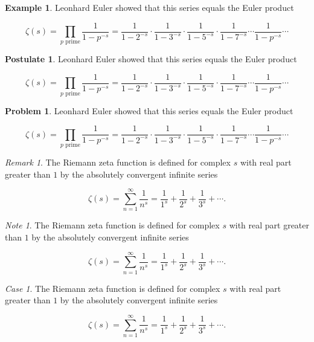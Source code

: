 \documentclass[english,oneside, article]{memoir}
\theoremstyle{plain}
\theoremstyle{definition}
\newtheorem{Example}{Example}[chapter]
\newtheorem{Postulate}{Postulate}[chapter]
\newtheorem{Problem}{Problem}[chapter]
\theoremstyle{remark}
\newtheorem{Case}{Case}[chapter]
\newtheorem*{Remark}{Remark}
\newtheorem*{Note}{Note}
\begin{document}
\begin{Example}

Leonhard Euler showed that this series equals the Euler product

\[\zeta(s) = \prod_{p \text{ prime}} \frac{1}{1-p^{-s}}= \frac{1}{1-2^{-s}}\cdot\frac{1}{1-3^{-s}}\cdot\frac{1}{1-5^{-s}}\cdot\frac{1}{1-7^{-s}} \cdots \frac{1}{1-p^{-s}} \cdots\]

\end{Example}

\begin{Postulate}

Leonhard Euler showed that this series equals the Euler product

\[\zeta(s) = \prod_{p \text{ prime}} \frac{1}{1-p^{-s}}= \frac{1}{1-2^{-s}}\cdot\frac{1}{1-3^{-s}}\cdot\frac{1}{1-5^{-s}}\cdot\frac{1}{1-7^{-s}} \cdots \frac{1}{1-p^{-s}} \cdots\]

\end{Postulate}

\begin{Problem}

Leonhard Euler showed that this series equals the Euler product

\[\zeta(s) = \prod_{p \text{ prime}} \frac{1}{1-p^{-s}}= \frac{1}{1-2^{-s}}\cdot\frac{1}{1-3^{-s}}\cdot\frac{1}{1-5^{-s}}\cdot\frac{1}{1-7^{-s}} \cdots \frac{1}{1-p^{-s}} \cdots\]

\end{Problem}

\begin{Remark}

The Riemann zeta function is defined for complex \(s\) with real part
greater than \(1\) by the absolutely convergent infinite series

\[\zeta(s) = \sum_{n=1}^\infty \frac{1}{n^s} = \frac{1}{1^s} + \frac{1}{2^s} + \frac{1}{3^s} + \cdots.\]

\end{Remark}

\begin{Note}

The Riemann zeta function is defined for complex \(s\) with real part
greater than \(1\) by the absolutely convergent infinite series

\[\zeta(s) = \sum_{n=1}^\infty \frac{1}{n^s} = \frac{1}{1^s} + \frac{1}{2^s} + \frac{1}{3^s} + \cdots.\]

\end{Note}

\begin{Case}

The Riemann zeta function is defined for complex \(s\) with real part
greater than \(1\) by the absolutely convergent infinite series

\[\zeta(s) = \sum_{n=1}^\infty \frac{1}{n^s} = \frac{1}{1^s} + \frac{1}{2^s} + \frac{1}{3^s} + \cdots.\]

\end{Case}
\end{document}
